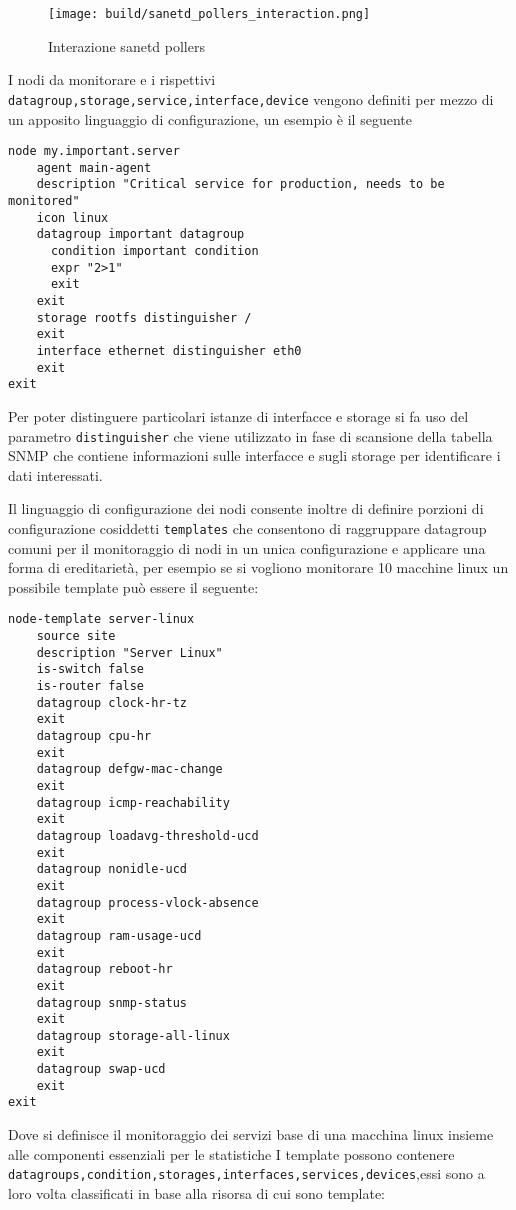 \begin{figure}[H]
    \centering
    \texttt{[image: build/sanetd\_pollers\_interaction.png]}
    \caption{Interazione sanetd pollers}
    \label{fig:enter-label}
\end{figure}

I nodi da monitorare e i rispettivi \verb|datagroup,storage,service,interface,device| vengono definiti per mezzo di un apposito linguaggio di configurazione, un esempio è il seguente

\begin{lstlisting}
node my.important.server
    agent main-agent
    description "Critical service for production, needs to be monitored"
    icon linux
    datagroup important datagroup
      condition important condition
      expr "2>1"
      exit
    exit
    storage rootfs distinguisher /
    exit
    interface ethernet distinguisher eth0
    exit
exit
\end{lstlisting}

Per poter distinguere particolari istanze di interfacce e storage si fa uso del parametro \verb|distinguisher| che viene utilizzato in fase di scansione della tabella SNMP che contiene informazioni sulle interfacce e sugli storage per identificare i dati interessati.

Il linguaggio di configurazione dei nodi consente inoltre di definire porzioni di configurazione cosiddetti \verb|templates| che consentono di raggruppare datagroup comuni per il monitoraggio di nodi in un unica configurazione e applicare una forma di ereditarietà, per esempio se si vogliono monitorare 10 macchine linux un possibile template può essere il seguente:

\begin{lstlisting}
node-template server-linux
    source site
    description "Server Linux"
    is-switch false
    is-router false
    datagroup clock-hr-tz
    exit
    datagroup cpu-hr
    exit
    datagroup defgw-mac-change
    exit
    datagroup icmp-reachability
    exit
    datagroup loadavg-threshold-ucd
    exit
    datagroup nonidle-ucd
    exit
    datagroup process-vlock-absence
    exit
    datagroup ram-usage-ucd
    exit
    datagroup reboot-hr
    exit
    datagroup snmp-status
    exit
    datagroup storage-all-linux
    exit
    datagroup swap-ucd
    exit
exit
\end{lstlisting}

Dove si definisce il monitoraggio dei servizi base di una macchina linux insieme alle componenti essenziali per le statistiche
I template possono contenere \verb|datagroups,condition,storages,interfaces,services,devices|,essi sono a loro volta classificati in base alla risorsa di cui sono template:

